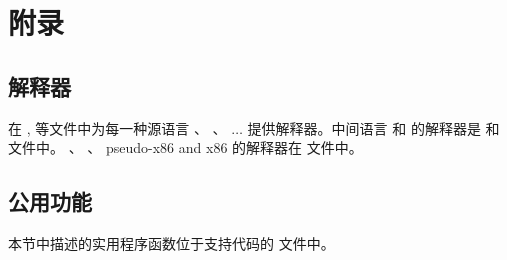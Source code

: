 \documentclass[11pt]{book}
\begin{document}
\chapter{附录}

\section{解释器}
\label{appendix:interp}

在 , 等文件中为每一种源语言 \LangInt{} 、
\LangVar{} 、 $\ldots$ 提供解释器。中间语言 \LangCVar{} 和 \LangCIf{} 的解释器是  和
 文件中。 \LangCVec{} 、 \LangCFun{} 、 pseudo-x86
and x86 的解释器在  文件中。

\section{公用功能}
\label{appendix:utilities}

本节中描述的实用程序函数位于支持代码的  文件中。

\paragraph{}
\end{document}
